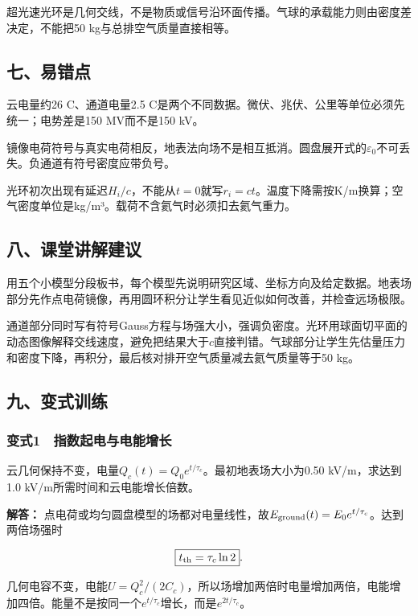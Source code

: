\documentclass[12pt,a4paper,fontset=fandol]{ctexart}
\begin{document}
超光速光环是几何交线，不是物质或信号沿环面传播。气球的承载能力则由密度差决定，不能把50
kg与总排空气质量直接相等。

\subsection{七、易错点}\label{ux4e03ux6613ux9519ux70b9-6}

云电量约26 C、通道电量2.5
C是两个不同数据。微伏、兆伏、公里等单位必须先统一；电势差是150
MV而不是150 kV。

镜像电荷符号与真实电荷相反，地表法向场不是相互抵消。圆盘展开式的\(\varepsilon_0\)不可丢失。负通道有符号密度应带负号。

光环初次出现有延迟\(H_i/c\)，不能从\(t=0\)就写\(r_i=ct\)。温度下降需按K/m换算；空气密度单位是kg/m³。载荷不含氦气时必须扣去氦气重力。

\subsection{八、课堂讲解建议}\label{ux516bux8bfeux5802ux8bb2ux89e3ux5efaux8bae-6}

用五个小模型分段板书，每个模型先说明研究区域、坐标方向及给定数据。地表场部分先作点电荷镜像，再用圆环积分让学生看见近似如何改善，并检查远场极限。

通道部分同时写有符号Gauss方程与场强大小，强调负密度。光环用球面切平面的动态图像解释交线速度，避免把结果大于\(c\)直接判错。气球部分让学生先估量压力和密度下降，再积分，最后核对排开空气质量减去氦气质量等于50
kg。

\subsection{九、变式训练}\label{ux4e5dux53d8ux5f0fux8badux7ec3-6}

\subsubsection{变式1　指数起电与电能增长}\label{ux53d8ux5f0f1-ux6307ux6570ux8d77ux7535ux4e0eux7535ux80fdux589eux957f}

云几何保持不变，电量\(Q_c(t)=Q_0e^{t/\tau_c}\)。最初地表场大小为0.50
kV/m，求达到1.0 kV/m所需时间和云电能增长倍数。

\textbf{解答：}
点电荷或均匀圆盘模型的场都对电量线性，故\(E_{\rm ground}(t)=E_0e^{t/\tau_c}\)。达到两倍场强时

\[
\boxed{t_{\rm th}=\tau_c\ln2}.
\]

几何电容不变，电能\(U=Q_c^2/(2C_c)\)，所以场增加两倍时电量增加两倍，电能增加四倍。能量不是按同一个\(e^{t/\tau_c}\)增长，而是\(e^{2t/\tau_c}\)。
\end{document}
